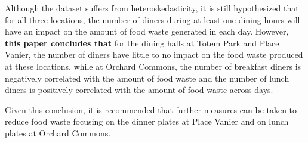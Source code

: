 Although the dataset suffers from heteroskedasticity, it is still hypothesized that for all three locations, the number of diners during at least one dining hours will have an impact on the amount of food waste generated in each day. However, \textbf{this paper concludes that} for the dining halls at Totem Park and Place Vanier, the number of diners have little to no impact on the food waste produced at these locations, while at Orchard Commons, the number of breakfast diners is negatively correlated with the amount of food waste and the number of lunch diners is positively correlated with the amount of food waste across days.

Given this conclusion, it is recommended that further measures can be taken to reduce food waste focusing on the dinner plates at Place Vanier and on lunch plates at Orchard Commons.
\newpage